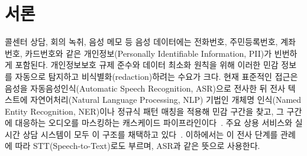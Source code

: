 \documentclass[11pt]{article}
\begin{document}
\begin{abstract}
Whisper 기반 STT+NLP 표준 경로와 동일 인스턴스에서 비교하면 실패 지점이 갈린다. 16자리
카드번호 재현율은 기본·프롬프트·빔 서치·결합의 네 디코딩 설정 모두에서 $0.802$--$0.864$인
반면 CNN은 세 시드 전부 $1.000$이어서, 긴 숫자열에 대한 전사 취약성이 설정 미조정이 아님을
확인하였다. 반대로 정밀도는 STT+NLP가 $1.000$ 대 $0.787$로 앞선다. 이 상보성을 근거로
``CNN 프리필터 $\rightarrow$ STT+NLP 확정''의 2단계 파이프라인과 그 손익분기 모형을 제시한다.

본 결과는 음성합성(Text-to-Speech, TTS)으로 만든 합성 데이터에 한정된다. 열화 실험에서
8\,kHz 협대역과 G.711 코덱은 F1을 $0.859$에서 $0.831$로 낮추는 데 그친다. 잡음의 영향은 잡음을
어느 대역에 넣는지에 좌우된다. 전화 통과대역(300--3400\,Hz)으로 제한한 잡음에서는 SNR 20\,dB까지
재현율이 $0.931$로 유지되고, 학습 데이터의 절반에 같은 열화를 섞어 재학습하면 SNR 5\,dB에서도
F1이 $0.777$로 평평해진다(증강 없으면 $0.491$). 대가는 깨끗한 조건의 F1 $0.859\to0.807$이다.
다만 같은 조건에서 STT+NLP가 $0.932$--$0.962$를 유지하므로, 잡음 구간에서 프리필터가 더 많이
잃는다는 사실은 남는다.
또한 평가의 지배적 불확실성은 학습 난수가 아니라 문장 템플릿 구성이어서, 템플릿 그룹
부트스트랩으로 잰 F1의 95\% 구간은 $[0.519, 0.960]$이다(재표집 단위가 여섯 그룹뿐이라
불확실성의 하한으로 읽어야 한다). 실통화 검증, 잡음 강건화, 운용
정밀도 개선을 남은 과제로 명시한다.
\end{abstract}

\section{서론}\label{sec:intro}

콜센터 상담, 회의 녹취, 음성 메모 등 음성 데이터에는 전화번호, 주민등록번호, 계좌번호,
카드번호와 같은 개인정보(Personally Identifiable Information, PII)가 빈번하게 포함된다.
개인정보보호 규제 준수와 데이터 최소화 원칙을 위해 이러한 민감 정보를 자동으로 탐지하고
비식별화(redaction)하려는 수요가 크다. 현재 표준적인 접근은 음성을
자동음성인식(Automatic Speech Recognition, ASR)으로 전사한 뒤 전사 텍스트에
자연어처리(Natural Language Processing, NLP) 기법인 개체명 인식(Named Entity Recognition,
NER)이나 정규식 패턴 매칭을 적용해 민감 구간을 찾고, 그 구간에 대응하는 오디오를 마스킹하는
캐스케이드 파이프라인이다~\cite{cohn2019audiodeid}. 주요 상용 서비스와 실시간 상담 시스템이
모두 이 구조를 채택하고 있다~\cite{azurepii,gouvea2023trustera}. 이하에서는 이 전사 단계를
관례에 따라 STT(Speech-to-Text)로도 부르며, ASR과 같은 뜻으로 사용한다.
\end{document}

